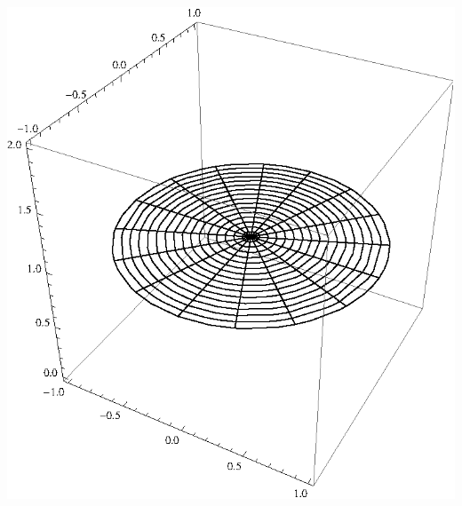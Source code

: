 \documentclass[10pt,a4paper]{scrartcl}
\begin{document}
\begin{enumerate}[(i)]
\begin{minipage}{0.50\columnwidth}
\begin{center}
\includegraphics[scale=0.7]{1iv2.eps} 
\end{center}
\end{minipage}
\end{enumerate}
\end{document}
